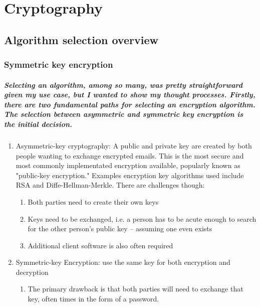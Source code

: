 

\chapter{Cryptography}

\section{Algorithm selection overview}

\subsection{Symmetric key encryption}
\paragraph{Selecting an algorithm, among so many, was pretty straightforward given my use case, but I wanted to show my thought processes. Firstly, there are two fundamental paths for selecting an encryption algorithm. The selection between \emph{asymmetric} and \emph{symmetric} key encryption is the initial decision.}

\begin{enumerate}
\item Asymmetric-key cryptography: A public and private key are created by both people wanting to exchange encrypted emails. This is the most secure and most commonly implementated encryption available, popularly known as "public-key encryption." Examples encryption key algorithms used include RSA and Diffe-Hellman-Merkle.
There are challenges though:\cite{book0}
\begin{enumerate}
\item Both parties need to create their own keys
\item Keys need to be exchanged, i.e. a person has to be acute enough to search for the other person's public key -- assuming one even exists
\item Additional client software is also often required
\end{enumerate}
\item Symmetric-key Encryption: use the same key for both encryption and decryption\cite[p. 155]{book1}
\begin{enumerate}
\item The primary drawback is that both parties will need to exchange that key, often times in the form of a password.
\end{enumerate}
\end{enumerate}

